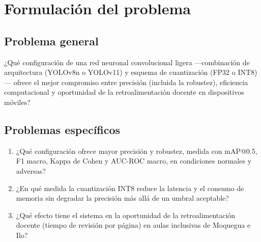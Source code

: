 \section{Formulación del problema}

\subsection{Problema general}
¿Qué configuración de una red neuronal convolucional ligera ---combinación de
arquitectura (YOLOv8n o YOLOv11) y esquema de cuantización (FP32 o INT8)--- ofrece
el mejor compromiso entre precisión (incluida la robustez), eficiencia
computacional y oportunidad de la retroalimentación docente en dispositivos
móviles?

\subsection{Problemas específicos}
\begin{enumerate}
  \item ¿Qué configuración ofrece mayor precisión y robustez, medida con
  mAP@0.5, F1 macro, Kappa de Cohen y AUC-ROC macro, en condiciones normales y
  adversas?
  \item ¿En qué medida la cuantización INT8 reduce la latencia y el consumo de
  memoria sin degradar la precisión más allá de un umbral aceptable?
  \item ¿Qué efecto tiene el sistema en la oportunidad de la retroalimentación
  docente (tiempo de revisión por página) en aulas inclusivas de Moquegua e Ilo?
\end{enumerate}
